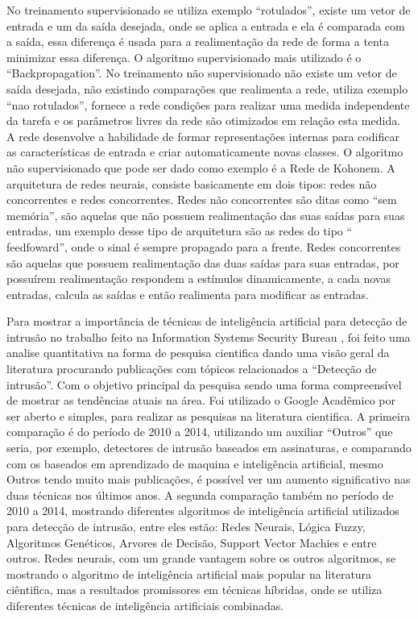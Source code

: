 No treinamento supervisionado se utiliza exemplo “rotulados”, existe um vetor de entrada e um da saída desejada, onde se aplica a entrada e ela é comparada com a saída, essa diferença é usada para a realimentação da rede de forma a tenta minimizar essa diferença. O algoritmo supervisionado mais utilizado é o “Backpropagation”.
No treinamento não supervisionado não existe um vetor de saída desejada, não existindo comparações que realimenta a rede, utiliza exemplo “nao rotulados”, fornece a rede condições  para realizar uma medida independente da tarefa e os parâmetros livres da rede são otimizados em relação esta medida. A rede desenvolve a habilidade de formar representações internas para codificar as características de entrada e criar automaticamente novas classes. O algoritmo não supervisionado que pode ser dado como exemplo é a Rede de Kohonem.
A arquitetura de redes neurais, consiste basicamente em dois tipos: redes não concorrentes e redes concorrentes. 
Redes não concorrentes são ditas como “sem memória”, são aquelas que não possuem realimentação das suas saídas para suas entradas, um exemplo desse tipo de arquitetura são as redes do tipo “ feedfoward”, onde o sinal é sempre propagado para a frente.
Redes concorrentes são aquelas que possuem realimentação das duas saídas para suas entradas, por possuírem realimentação respondem a estímulos dinamicamente, a cada novas entradas, calcula as saídas e então realimenta para modificar as entradas.

Para mostrar a importância de técnicas de inteligência artificial para detecção de intrusão no trabalho feito na Information Systems Security Bureau \cite{Zhang}, foi feito uma analise quantitativa na forma de pesquisa cientifica dando uma visão geral da literatura procurando publicações com tópicos relacionados a “Detecção de intrusão”. 
Com o objetivo principal da pesquisa sendo uma forma compreensível de mostrar as tendências atuais na área. 
Foi utilizado o Google Acadêmico por ser aberto e simples, para realizar as pesquisas na literatura cientifica. 
A primeira comparação é  do período de 2010 a 2014, utilizando um auxiliar “Outros” que seria, por exemplo, detectores de intrusão baseados em assinaturas, e comparando com os baseados em aprendizado de maquina e inteligência artificial, mesmo Outros tendo muito mais publicações, é possível ver um aumento significativo nas duas técnicas nos últimos anos.
A segunda comparação também no período de 2010 a 2014, mostrando diferentes algoritmos de inteligência artificial utilizados para detecção de intrusão, entre eles estão: Redes Neurais, Lógica Fuzzy, Algoritmos Genéticos, Arvores de Decisão, Support Vector Machies e entre outros. 
Redes neurais, com um grande vantagem sobre os outros algoritmos, se mostrando o algoritmo de inteligência artificial mais popular na literatura ciêntifica, mas a resultados promissores em técnicas híbridas, onde se utiliza diferentes técnicas de inteligência artificiais combinadas.

